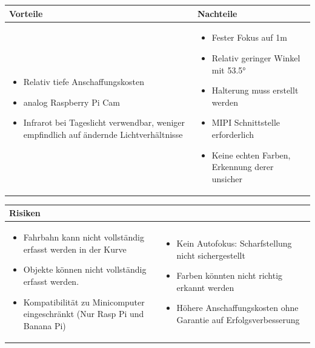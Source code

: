 \begin{table}[h]
\begin{tabular}{p{} | p{}}


 \textbf{Vorteile} & \textbf{Nachteile} \\ \hline
	 
\begin{itemize}
\item Relativ tiefe Anschaffungskosten
\item analog Raspberry Pi Cam
\item Infrarot bei Tageslicht verwendbar, weniger empfindlich auf ändernde Lichtverhältnisse
\end{itemize}

 
 &
 
\begin{itemize}
\item Fester Fokus auf 1m
\item Relativ geringer Winkel mit 53.5°
\item Halterung muss erstellt werden
\item MIPI Schnittstelle erforderlich
\item Keine echten Farben, Erkennung derer unsicher
\end{itemize}

\end{tabular}
\end{table}

\begin{table}[h]
\begin{tabular}{p{}p{}}


 \textbf{Risiken} & \\ \hline
	 
\begin{itemize}
\item Fahrbahn kann nicht vollständig erfasst werden in der Kurve
\item Objekte können nicht vollständig erfasst werden.
\item Kompatibilität zu Minicomputer eingeschränkt (Nur Rasp Pi und Banana Pi)
\end{itemize}
&
\begin{itemize}
\item Kein Autofokus: Scharfstellung nicht sichergestellt
\item Farben könnten nicht richtig erkannt werden
\item Höhere Anschaffungskosten ohne Garantie auf Erfolgsverbesserung
\end{itemize}

 
\end{tabular}
\end{table}

